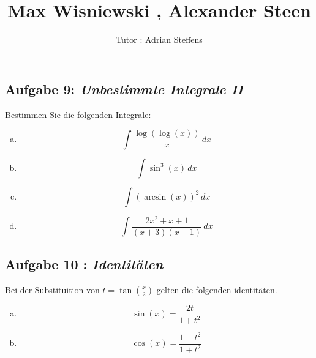 \documentclass[11pt,a4paper,ngerman]{article}
\date{}
\title{Max Wisniewski , Alexander Steen}
\author{Tutor : Adrian Steffens}
\begin{document}

\maketitle
\thispagestyle{fancy}


\subsection*{Aufgabe 9: \mdseries\itshape Unbestimmte Integrale II}

Bestimmen Sie die folgenden Integrale:

\begin{enumerate}[a.]
    
    \item
        $$
            \int \frac{\log ( \log (x))}{x} \, dx
        $$

    \item
        $$
            \int \sin^3 (x) \, dx
        $$

    \item
        $$
           \int \left( \arcsin (x) \right)^2 \, dx
        $$

    \item
        $$
            \int \frac{2x^2 + x + 1}{(x+3)(x-1)} \, dx
        $$

\end{enumerate}


\subsection*{Aufgabe 10 : \mdseries\itshape Identitäten}

Bei der Substituition von $t = \tan \left(\frac{x}{2} \right)$ gelten die folgenden
identitäten.

\begin{enumerate}[a.]
    \addtocounter{enumi}{4}
    \item
        $$
            \sin (x) = \frac{2t}{1+t^2}
        $$
    \item
        $$
            \cos (x) = \frac{1-t^2}{1+t^2}
        $$

\end{enumerate}
        
\end{document}
